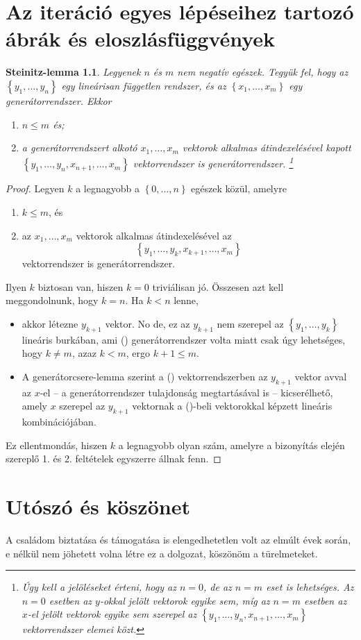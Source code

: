 \documentclass[twoside, magyar, showtrims]{corvinusphd}
\theoremstyle{plain}
\newtheorem*{SL}{Steinitz-lemma}
\theoremstyle{remark}
\theoremstyle{definition}
\begin{document}
\chapter{Az iteráció egyes lépéseihez tartozó ábrák és eloszlásfüggvények}\label{app:2}
\begin{SL}
	Legyenek $n$ és $m$ nem negatív egészek.
	Tegyük fel, hogy az $\left\{ y_1,\ldots,y_n \right\}$ egy lineárisan független rendszer,
	és az
	$\left\{ x_1,\ldots,x_m \right\}$ egy generátorrendszer.
	Ekkor
	\begin{enumerate}
		\item $n\leq m$ és;
		\item a generátorrendszert alkotó $x_1,\ldots,x_m$ vektorok alkalmas átindexelésével kapott
		      \(
		      \left\{ y_1,\ldots,y_n,x_{n+1},\ldots,x_m \right\}
		      \)
		      vektorrendszer is generátorrendszer.%
		      \footnote{Úgy kell a jelöléseket érteni, hogy az $n=0$, de az $n=m$ eset is lehetséges.
		      Az $n=0$ esetben az $y$-okkal jelölt vektorok egyike sem,
		      míg az $n=m$ esetben az $x$-el jelölt vektorok egyike sem szerepel az
		      \(
		      \left\{ y_1,\ldots,y_n,x_{n+1},\ldots,x_m \right\}
		      \)
		      vektorrendszer elemei közt.}%
		      \qedhere
	\end{enumerate}
	\label{le:Steinitz}
\end{SL}
\begin{proof}
	Legyen $k$ a legnagyobb a $\left\{ 0,\ldots,n \right\}$ egészek közül, amelyre
	\begin{enumerate}
		\item $k\leq m$, és
		\item az $x_1,\ldots,x_m$ vektorok alkalmas átindexelésével az
		      \[
			      \left\{ y_1,\ldots,y_k,x_{k+1},\ldots,x_m \right\}\tag{\dag}
		      \]
		      vektorrendszer is generátorrendszer.
	\end{enumerate}
	Ilyen $k$ biztosan van, hiszen $k=0$ triviálisan jó.
	Összesen azt kell meggondolnunk, hogy $k=n$.
	Ha $k<n$ lenne,
	\begin{itemize}
		\item
		      akkor létezne $y_{k+1}$ vektor.
		      No de, ez az $y_{k+1}$ nem szerepel az $\left\{ y_1,\ldots,y_k \right\}$ lineáris burkában,
		      ami (\dag) generátorrendszer volta miatt csak úgy lehetséges,
		      hogy $k\neq m$, azaz $k<m$, ergo $k+1\leq m$.
		\item
		      A generátorcsere-lemma szerint a (\dag) vektorrendszerben az $y_{k+1}$ vektor
		      avval az $x$-el
		      -- a generátorrendszer tulajdonság megtartásával is --
		      kicserélhető,
		      amely $x$ szerepel az $y_{k+1}$ vektornak a (\dag)-beli
		      vektorokkal képzett lineáris kombinációjában.
	\end{itemize}
	Ez ellentmondás, hiszen $k$ a legnagyobb olyan szám,
	amelyre a bizonyítás elején szereplő 1. és 2. feltételek egyszerre állnak fenn.
\end{proof}

\renewcommand{\indexname}{Betűrendes mutató}
\printindex

\chapter*{Utószó és köszönet}
\scwords 
A családom biztatása és támogatása is elengedhetetlen volt
az elmúlt évek során, e nélkül nem jöhetett
volna létre ez a dolgozat, köszönöm a türelmeteket. 
\end{document}
